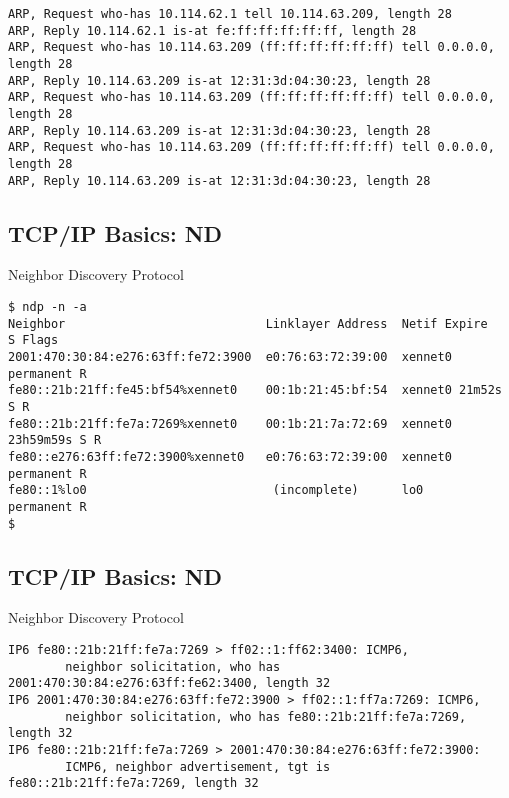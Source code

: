 \documentclass[xga]{xdvislides}
\begin{document}
\begin{verbatim}
ARP, Request who-has 10.114.62.1 tell 10.114.63.209, length 28
ARP, Reply 10.114.62.1 is-at fe:ff:ff:ff:ff:ff, length 28
ARP, Request who-has 10.114.63.209 (ff:ff:ff:ff:ff:ff) tell 0.0.0.0, length 28
ARP, Reply 10.114.63.209 is-at 12:31:3d:04:30:23, length 28
ARP, Request who-has 10.114.63.209 (ff:ff:ff:ff:ff:ff) tell 0.0.0.0, length 28
ARP, Reply 10.114.63.209 is-at 12:31:3d:04:30:23, length 28
ARP, Request who-has 10.114.63.209 (ff:ff:ff:ff:ff:ff) tell 0.0.0.0, length 28
ARP, Reply 10.114.63.209 is-at 12:31:3d:04:30:23, length 28
\end{verbatim}

\subsection{TCP/IP Basics: ND}
\begin{center}
Neighbor Discovery Protocol
\end{center}
\vspace{.2in}

\begin{verbatim}
$ ndp -n -a
Neighbor                            Linklayer Address  Netif Expire      S Flags
2001:470:30:84:e276:63ff:fe72:3900  e0:76:63:72:39:00  xennet0 permanent R
fe80::21b:21ff:fe45:bf54%xennet0    00:1b:21:45:bf:54  xennet0 21m52s    S R
fe80::21b:21ff:fe7a:7269%xennet0    00:1b:21:7a:72:69  xennet0 23h59m59s S R
fe80::e276:63ff:fe72:3900%xennet0   e0:76:63:72:39:00  xennet0 permanent R
fe80::1%lo0                          (incomplete)      lo0     permanent R
$
\end{verbatim}

\subsection{TCP/IP Basics: ND}
\begin{center}
Neighbor Discovery Protocol
\end{center}
\vspace{.2in}
\begin{verbatim}
IP6 fe80::21b:21ff:fe7a:7269 > ff02::1:ff62:3400: ICMP6,
        neighbor solicitation, who has 2001:470:30:84:e276:63ff:fe62:3400, length 32
IP6 2001:470:30:84:e276:63ff:fe72:3900 > ff02::1:ff7a:7269: ICMP6,
        neighbor solicitation, who has fe80::21b:21ff:fe7a:7269, length 32
IP6 fe80::21b:21ff:fe7a:7269 > 2001:470:30:84:e276:63ff:fe72:3900:
        ICMP6, neighbor advertisement, tgt is fe80::21b:21ff:fe7a:7269, length 32
\end{verbatim}
\end{document}
